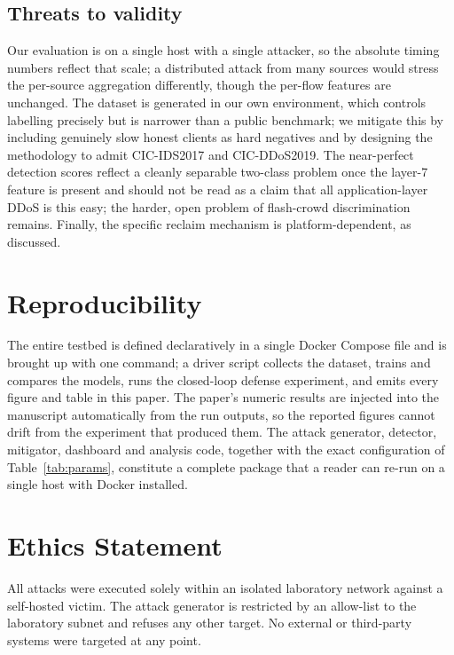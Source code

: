 \documentclass[conference]{IEEEtran}
\begin{document}
\subsection{Threats to validity}
Our evaluation is on a single host with a single attacker, so the absolute timing
numbers reflect that scale; a distributed attack from many sources would stress the
per-source aggregation differently, though the per-flow features are unchanged. The
dataset is generated in our own environment, which controls labelling precisely but
is narrower than a public benchmark; we mitigate this by including genuinely slow
honest clients as hard negatives and by designing the methodology to admit
CIC-IDS2017 and CIC-DDoS2019. The near-perfect detection scores reflect a cleanly
separable two-class problem once the layer-7 feature is present and should not be
read as a claim that all application-layer DDoS is this easy; the harder, open
problem of flash-crowd discrimination~\cite{deressu2026survey} remains. Finally, the
specific reclaim mechanism is platform-dependent, as discussed.

\section{Reproducibility}
The entire testbed is defined declaratively in a single Docker Compose file and is
brought up with one command; a driver script collects the dataset, trains and
compares the models, runs the closed-loop defense experiment, and emits every
figure and table in this paper. The paper's numeric results are injected into the
manuscript automatically from the run outputs, so the reported figures cannot drift
from the experiment that produced them. The attack generator, detector, mitigator,
dashboard and analysis code, together with the exact configuration of
Table~\ref{tab:params}, constitute a complete package that a reader can re-run on a
single host with Docker installed.

\section*{Ethics Statement}
\label{sec:ethics}
All attacks were executed solely within an isolated laboratory network against a
self-hosted victim. The attack generator is restricted by an allow-list to the
laboratory subnet and refuses any other target. No external or third-party
systems were targeted at any point.



\end{document}
